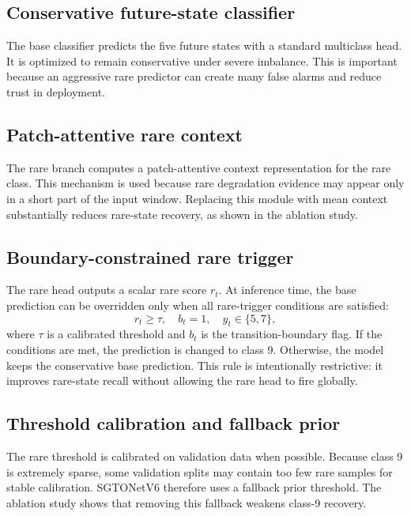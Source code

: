 \subsection{Conservative future-state classifier}

The base classifier predicts the five future states with a standard multiclass head. It is optimized to remain conservative under severe imbalance. This is important because an aggressive rare predictor can create many false alarms and reduce trust in deployment.

\subsection{Patch-attentive rare context}

The rare branch computes a patch-attentive context representation for the rare class. This mechanism is used because rare degradation evidence may appear only in a short part of the input window. Replacing this module with mean context substantially reduces rare-state recovery, as shown in the ablation study.

\subsection{Boundary-constrained rare trigger}

The rare head outputs a scalar rare score $r_t$. At inference time, the base prediction can be overridden only when all rare-trigger conditions are satisfied:
\begin{equation}
r_t \geq \tau,\quad b_t=1,\quad y_t \in \{5,7\},
\end{equation}
where $\tau$ is a calibrated threshold and $b_t$ is the transition-boundary flag. If the conditions are met, the prediction is changed to class 9. Otherwise, the model keeps the conservative base prediction. This rule is intentionally restrictive: it improves rare-state recall without allowing the rare head to fire globally.

\subsection{Threshold calibration and fallback prior}

The rare threshold is calibrated on validation data when possible. Because class 9 is extremely sparse, some validation splits may contain too few rare samples for stable calibration. SGTONetV6 therefore uses a fallback prior threshold. The ablation study shows that removing this fallback weakens class-9 recovery.
